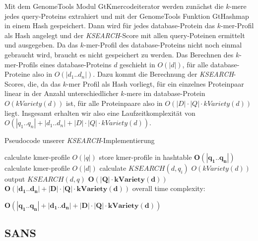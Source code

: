 \documentclass{article}
\begin{document}
Mit dem GenomeTools Modul GtKmercodeiterator werden zunächst die $k$-mere jedes query-Proteins extrahiert und mit der GenomeTools Funktion GtHashmap in einem Hash gespeichert.
Dann wird für jedes database-Protein das $k$-mer-Profil als Hash angelegt und der \emph{KSEARCH}-Score mit allen query-Poteinen ermittelt und ausgegeben. 
Da das $k$-mer-Profil des database-Proteins nicht noch einmal gebraucht wird, braucht es nicht gespeichert zu werden. Das Berechnen des $k$-mer-Profils eines database-Proteins $d$ geschieht in $O(|d|)$, 
für alle database-Proteine also in $O(|d_1..d_n|)$. Dazu kommt die Berechnung der \emph{KSEARCH}-Scores, die, da das $k$-mer Profil als Hash vorliegt, für ein einzelnes Proteinpaar linear in der Anzahl unterschiedlicher $k$-mere im database-Protein $O(kVariety(d))$ ist, für alle Proteinpaare also in $O(|D| \cdot |Q| \cdot kVariety(d))$ liegt. Insgesamt erhalten wir also eine Laufzeitkomplexität von $O(|q_1..q_n|+|d_1..d_n|+|D| \cdot |Q| \cdot kVariety(d))$.



\begin{algorithm}
  \caption{Pseudocode unserer \emph{KSEARCH}-Implementierung}
\begin{algorithmic}
      \State calculate kmer-profile \Comment $O(|q|)$
      \State store kmer-profile in hashtable
    \EndFor \Comment $\mathbf{O(|q_1..q_n|)}$
      \State calculate kmer-profile \Comment $O(|d|)$
        \State calculate $KSEARCH(d,q_{i})$ \Comment $O(kVariety(d))$   
        \State output $KSEARCH(d,q)$
      \EndFor \Comment $\mathbf{O(|Q| \cdot kVariety(d))}$
    \EndFor   \Comment $\mathbf{O(|d_1..d_n|+|D| \cdot |Q| \cdot kVariety(d))}$  
  \EndFunction 
  \Comment overall time complexity: 
  \begin{flushright}
  $\mathbf{O(|q_1..q_n|+|d_1..d_n|+|D| \cdot |Q| \cdot kVariety(d))}$
  \end{flushright}
\end{algorithmic}
\end{algorithm}

\subsection{SANS}
\label{sans}
\end{document}
